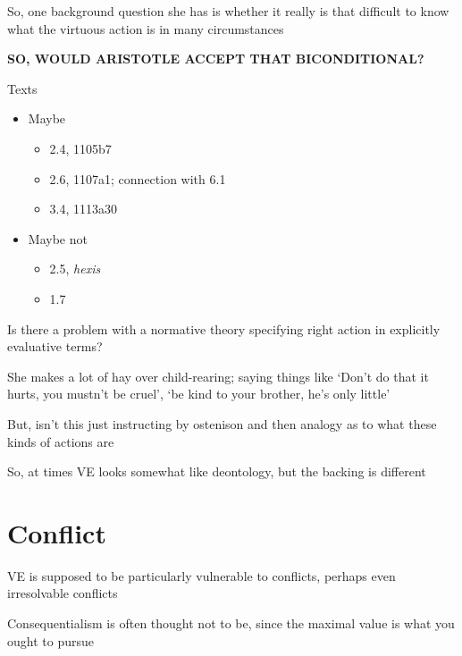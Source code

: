 \documentclass[11pt]{article}
\begin{document}
\noindent So, one background question she has is whether it really is that difficult to know what the virtuous action is in many circumstances
\vspace*{2mm}

\noindent \textbf{SO, WOULD ARISTOTLE ACCEPT THAT BICONDITIONAL?}
\vspace*{2mm}

\noindent Texts

\begin{itemize}\item{Maybe}\begin{itemize}\item{2.4, 1105b7}\item{2.6, 1107a1; connection with 6.1}\item{3.4, 1113a30}\end{itemize}\item{Maybe not}\begin{itemize}\item{2.5, \emph{hexis}}\item{1.7}\end{itemize}\end{itemize}

\noindent Is there a problem with a normative theory specifying right action in explicitly evaluative terms?
\vspace*{2mm}

\noindent She makes a lot of hay over child-rearing; saying things like `Don't do that it hurts, you mustn't be cruel', `be kind to your brother, he's only little'
\vspace*{2mm}

\noindent But, isn't this just instructing by ostenison and then analogy as to what these kinds of actions are
\vspace*{2mm}

\noindent So, at times VE looks somewhat like deontology, but the backing is different

\section*{Conflict}

\noindent VE is supposed to be particularly vulnerable to conflicts, perhaps even irresolvable conflicts
\vspace*{2mm}

\noindent Consequentialism is often thought not to be, since the maximal value is what you ought to pursue
\vspace*{2mm}
\end{document}

